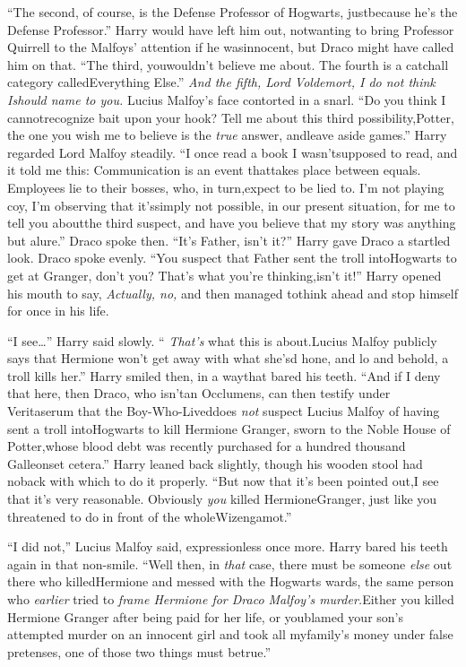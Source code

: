 ``The second, of course, is the Defense Professor of Hogwarts, justbecause he's the Defense Professor.'' Harry would have left him out, notwanting to bring Professor Quirrell to the Malfoys' attention if he wasinnocent, but Draco might have called him on that. ``The third, youwouldn't believe me about. The fourth is a catchall category calledEverything Else.'' \emph{And the fifth, Lord Voldemort, I do not think Ishould name to you.}
Lucius Malfoy's face contorted in a snarl. ``Do you think I cannotrecognize bait upon your hook? Tell me about this third possibility,Potter, the one you wish me to believe is the \emph{true} answer, andleave aside games.''
Harry regarded Lord Malfoy steadily. ``I once read a book I wasn'tsupposed to read, and it told me this: Communication is an event thattakes place between equals. Employees lie to their bosses, who, in turn,expect to be lied to. I'm not playing coy, I'm observing that it'ssimply not possible, in our present situation, for me to tell you aboutthe third suspect, and have you believe that my story was anything but alure.''
Draco spoke then. ``It's Father, isn't it?''
Harry gave Draco a startled look.
Draco spoke evenly. ``You suspect that Father sent the troll intoHogwarts to get at Granger, don't you? That's what you're thinking,isn't it!''
Harry opened his mouth to say, \emph{Actually, no,} and then managed tothink ahead and stop himself for once in his life.

``I see\ldots{}'' Harry said slowly. `` \emph{That's} what this is about.Lucius Malfoy publicly says that Hermione won't get away with what she'sd hone, and lo and behold, a troll kills her.'' Harry smiled then, in a waythat bared his teeth. ``And if I deny that here, then Draco, who isn'tan Occlumens, can then testify under Veritaserum that the Boy-Who-Liveddoes \emph{not} suspect Lucius Malfoy of having sent a troll intoHogwarts to kill Hermione Granger, sworn to the Noble House of Potter,whose blood debt was recently purchased for a hundred thousand Galleonset cetera.'' Harry leaned back slightly, though his wooden stool had noback with which to do it properly. ``But now that it's been pointed out,I see that it's very reasonable. Obviously \emph{you} killed HermioneGranger, just like you threatened to do in front of the wholeWizengamot.''

``I did not,'' Lucius Malfoy said, expressionless once more.
Harry bared his teeth again in that non-smile. ``Well then, in
\emph{that} case, there must be someone \emph{else} out there who killedHermione and messed with the Hogwarts wards, the same person who
\emph{earlier} tried to \emph{frame Hermione for Draco Malfoy's murder.}Either you killed Hermione Granger after being paid for her life, or youblamed your son's attempted murder on an innocent girl and took all myfamily's money under false pretenses, one of those two things must betrue.''

